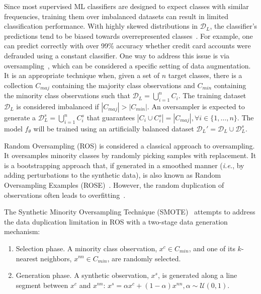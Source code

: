 Since most supervised ML classifiers are designed to expect classes with
similar frequencies, training them over imbalanced datasets can result in
limited classification performance.  With highly skewed distributions in
$\mathcal{D}_L$, the classifier’s predictions tend to be biased towards
overrepresented classes~\cite{fonseca2021improving}. For example, one can
predict correctly with over 99\% accuracy whether credit card accounts were
defrauded using a constant classifier. One way to address this issue is
via oversampling~\cite{douzas2019imbalanced}, which can
be considered a specific setting of data augmentation.
It is an appropriate technique when, given a set of $n$ target
classes, there is a collection $C_{maj}$ containing the majority class
observations and $C_{min}$ containing the minority class observations such
that $\mathcal{D}_L = \bigcup^n_{i=1} C_i$. The training dataset
$\mathcal{D}_L$ is considered imbalanced if $|C_{maj}| > |C_{min}|$.
An oversampler is expected to generate a $\mathcal{D}_L^s = \bigcup^n_{i=1} C_i^s$
that guarantees $|C_i \cup C_i^s| = |C_{maj}|, \forall i \in \{1, \ldots,
n\}$. The model $f_\theta$ will be trained using an artificially balanced
dataset $\mathcal{D}_L' = \mathcal{D}_L \cup \mathcal{D}_L^s$.

Random Oversampling (ROS) is considered a classical approach to oversampling.
It oversamples minority classes by randomly picking samples with replacement.
It is a bootstrapping approach that, if generated in a smoothed manner
(\textit{i.e.}, by adding perturbations to the synthetic data), is also
known as Random Oversampling Examples (ROSE)~\cite{menardi2014training}.
However, the random duplication of observations often leads to
overfitting~\cite{krawczyk2016learning}.

The Synthetic Minority Oversampling Technique (SMOTE)~\cite{chawla2002smote}
attempts to address the data duplication limitation in ROS with a two-stage 
data generation mechanism:

\begin{enumerate}

    \item Selection phase. A minority class observation, $x^c \in C_{min}$,
        and one of its $k$-nearest neighbors, $x^{nn} \in C_{min}$, are
        randomly selected.

    \item Generation phase. A synthetic observation, $x^s$, is generated along
        a line segment between $x^c$ and $x^{nn}$: $x^s = \alpha x^c +
        (1-\alpha)x^{nn}, \alpha \sim \mathcal{U}(0, 1)$.

\end{enumerate}

